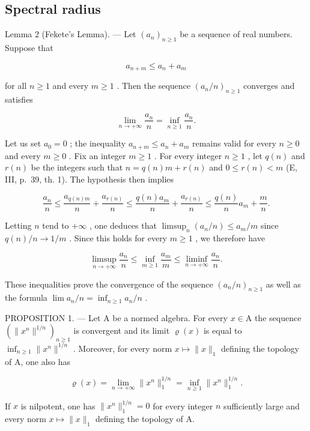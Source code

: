 \subsection{Spectral radius}

Lemma 2 (Fekete's Lemma). --- Let \((a_{n})_{n\geqslant1}\) be a sequence of real numbers. Suppose that

\[
a _ {n + m} \leqslant a _ {n} + a _ {m}
\]

for all \(n \geqslant 1\) and every \(m \geqslant 1\) . Then the sequence \((a_n / n)_{n \geqslant 1}\) converges and satisfies

\[
\lim _ {n \to + \infty} \frac {a _ {n}}{n} = \inf _ {n \geqslant 1} \frac {a _ {n}}{n}.
\]

Let us set \(a_0 = 0\) ; the inequality \(a_{n+m} \leqslant a_n + a_m\) remains valid for every \(n \geqslant 0\) and every \(m \geqslant 0\) . Fix an integer \(m \geqslant 1\) . For every integer \(n \geqslant 1\) , let \(q(n)\) and \(r(n)\) be the integers such that \(n = q(n)m + r(n)\) and \(0 \leqslant r(n) < m\) (E, III, p.~39, th. 1). The hypothesis then implies

\[
\frac {a _ {n}}{n} \leqslant \frac {a _ {q (n) m}}{n} + \frac {a _ {r (n)}}{n} \leqslant \frac {q (n) a _ {m}}{n} + \frac {a _ {r (n)}}{n} \leqslant \frac {q (n)}{n} a _ {m} + \frac {m}{n}.
\]

Letting \(n\) tend to \(+\infty\) , one deduces that \(\limsup_{n}(a_{n}/n) \leqslant a_{m}/m\) since \(q(n)/n \to 1/m\) . Since this holds for every \(m \geqslant 1\) , we therefore have

\[
\limsup _ {n \to + \infty} \frac {a _ {n}}{n} \leqslant \inf _ {m \geqslant 1} \frac {a _ {m}}{m} \leqslant \liminf _ {n \to + \infty} \frac {a _ {n}}{n}.
\]

These inequalities prove the convergence of the sequence \((a_{n}/n)_{n\geqslant1}\) as well as the formula \(\lim a_{n}/n = \inf_{n\geqslant1} a_{n}/n\) .

PROPOSITION 1. --- Let A be a normed algebra. For every \(x \in \mathrm{A}\) the sequence \((\|x^n\|^{1/n})_{n \geqslant 1}\) is convergent and its limit \(\varrho(x)\) is equal to \(\inf_{n \geqslant 1} \|x^n\|^{1/n}\) . Moreover, for every norm \(x \mapsto \|x\|_1\) defining the topology of A, one also has

\[
\varrho (x) = \lim _ {n \to + \infty} \| x ^ {n} \| _ {1} ^ {1 / n} = \inf _ {n \geqslant 1} \| x ^ {n} \| _ {1} ^ {1 / n}.
\]

If \(x\) is nilpotent, one has \(\| x^n\| _1^{1 / n} = 0\) for every integer \(n\) sufficiently large and every norm \(x\mapsto \| x\| _1\) defining the topology of A.


